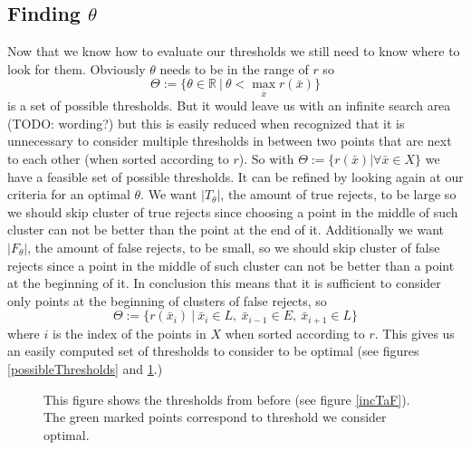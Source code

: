 \subsection{Finding $\theta$}
\label{findt}
Now that we know how to evaluate our thresholds we still need to know where to look for them. Obviously $\theta$ needs to be in the range of $r$ so
$$ \Theta := \{\theta \in \mathbb{R} \ | \ \theta < \operatorname*{max}_{\bar{x}} r(\bar{x})\}  $$
is a set of possible thresholds. But it would leave us with an infinite search area (TODO: wording?) but this is easily reduced when recognized that it is unnecessary to consider multiple thresholds in between two points that are next to each other (when sorted according to $r$). So with $\Theta := \{r(\bar{x}) | \forall \bar{x} \in X\}$ we have a feasible set of possible thresholds. It can be refined by looking again at our criteria for an optimal $\theta$. We want $|T_\theta|$, the amount of true rejects, to be large so we should skip cluster of true rejects since choosing a point in the middle of such cluster can not be better than the point at the end of it. Additionally we want  $|F_\theta|$, the amount of false rejects, to be small, so we should skip cluster of false rejects since a point in the middle of such cluster can not be better than a point at the beginning of it. In conclusion this means that it is sufficient to consider only points at the beginning of clusters of false rejects, so
$$ \Theta := \{r(\bar{x}_i) \ | \ \bar{x}_i \in L, \ \bar{x}_{i-1} \in E,\ \bar{x}_{i+1} \in L \} $$
where $i$ is the index of the points in $X$ when sorted according to $r$. This gives us an easily computed set of thresholds to consider to be optimal (see figures \ref{possibleThresholds} and \ref{paretoFront}.)

\begin{figure}[!htbp]
\centering
\caption{This figure shows the thresholds from before (see figure \ref{incTaF}). The green marked points correspond to threshold we consider optimal.}
\label{paretoFront}
\end{figure}

